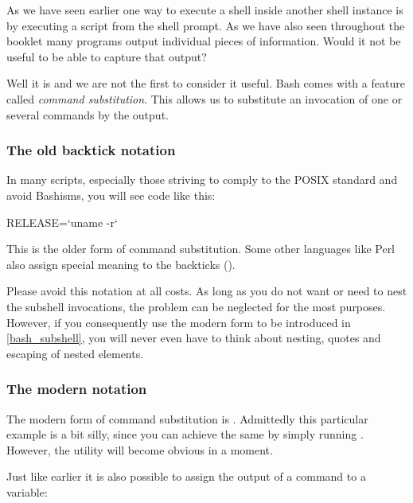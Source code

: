 \documentclass{olli-handout}
\begin{document}
As we have seen earlier  one way to execute a shell inside another shell instance is by executing a script from the shell prompt. As we have also seen throughout the booklet many programs output individual pieces of information. Would it not be useful to be able to capture that output?

Well it is and we are not the first to consider it useful. Bash comes with a feature called \emph{command substitution}. This allows us to substitute an invocation of one or several commands by the output.

\subsubsection{The old backtick notation}\label{bash_backtick}

In many scripts, especially those striving to comply to the POSIX standard and avoid Bashisms, you will see code like this:

\begin{lstbash}
RELEASE=`uname -r`
\end{lstbash}

This is the older form of command substitution. Some other languages like Perl also assign special meaning to the backticks ().

Please avoid this notation at all costs. As long as you do not want or need to nest the subshell invocations, the problem can be neglected for the most purposes. However, if you consequently use the modern form to be introduced in \vref{bash_subshell}, you will never even have to think about nesting, quotes and escaping of nested elements.

\subsubsection{The modern notation}\label{bash_subshell}

The modern form of command substitution is . Admittedly this particular example is a bit silly, since you can achieve the same by simply running . However, the utility will become obvious in a moment.

Just like earlier  it is also possible to assign the output of a command to a variable:

\end{document}
